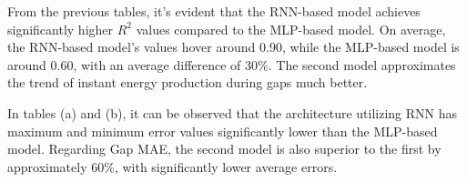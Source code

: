 From the previous tables, it's evident that the RNN-based model achieves significantly higher $R^2$ values compared to the MLP-based model. On average, the RNN-based model's values hover around 0.90, while the MLP-based model is around 0.60, with an average difference of 30\%. The second model approximates the trend of instant energy production during gaps much better.

In tables (a) and (b), it can be observed that the architecture utilizing RNN has maximum and minimum error values significantly lower than the MLP-based model. Regarding Gap MAE, the second model is also superior to the first by approximately 60\%, with significantly lower average errors.


